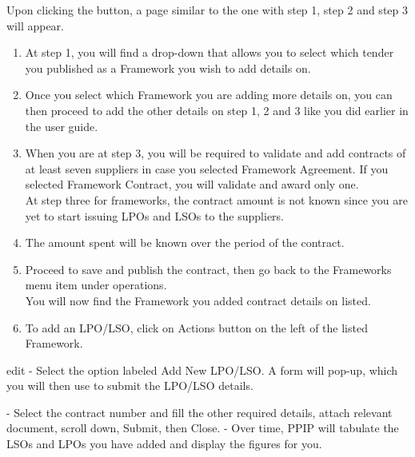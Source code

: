 \documentclass [12pt]{book}
\begin{document}
\begin{enumerate}
\begin{enumerate}
\begin{enumerate}
    \begin{enumerate}
        Upon clicking the button, a page similar to the one with step 1, step 2 and step 3 will appear.\\
        \begin{enumerate}    
            \item	At step 1, you will find a drop-down that allows you to select which tender you published as a Framework you wish to add details on.\\
            \item	Once you select which Framework you are adding more details on, you can then proceed to add the other details on step 1, 2 and 3 like you did earlier in the user guide.\\
            \item	When you are at step 3, you will be required to validate and add contracts of at least seven suppliers in case you selected Framework Agreement. If you selected Framework Contract, you will validate and award only one.\\
                    At step three for frameworks, the contract amount is not known since you are yet to start issuing LPOs and LSOs to the suppliers.\\
            \item	The amount spent will be known over the period of the contract.\\
            \item	Proceed to save and publish the contract, then go back to the Frameworks menu item under operations.\\
                    You will now find the Framework you added contract details on listed.\\
            \item	To add an LPO/LSO, click on Actions button on the left of the listed Framework.\\
        \end{enumerate}
    \end{enumerate}

    edit
    -	Select the option labeled Add New LPO/LSO. A form will pop-up, which you will then use to submit the LPO/LSO details.
    
    -	Select the contract number and fill the other required details, attach relevant document, scroll down, Submit, then Close.
    -	Over time, PPIP will tabulate the LSOs and LPOs you have added and display the figures for you. 

\end{enumerate}


\end{enumerate}
\end{enumerate}
\end{document}
